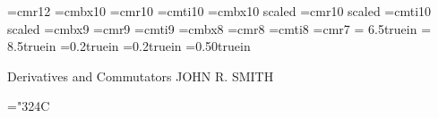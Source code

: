 \font\twelverm=cmr12
\font\tenbf=cmbx10
\font\tenrm=cmr10
\font\tenit=cmti10
\font\elevenbf=cmbx10 scaled
\font\elevenrm=cmr10 scaled
\font\elevenit=cmti10 scaled
\font\ninebf=cmbx9
\font\ninerm=cmr9
\font\nineit=cmti9
\font\eightbf=cmbx8
\font\eightrm=cmr8
\font\eightit=cmti8
\font\sevenrm=cmr7
%
%
\textwidth = 6.5truein
\textheight = 8.5truein
\oddsidemargin=0.2truein
\evensidemargin=0.2truein
\topmargin=0.50truein

\null
\begin{center}{{\tenbf Derivatives and Commutators}}
		\vglue 1.0cm
 	       {\tenrm JOHN R.\,\,SMITH\\}
\end{center}
%
\newcommand{\unit}[1]{\mbox{\it #1}}
\newcommand{\subs}[1]{\mbox{\scriptsize\it #1}}
\def\Q2{$Q^2$}
\def\sgp{$\sigma_{\gamma p}\:$}
\mathchardef\Lcur="324C
\def\crfive{\cr\noalign{\vskip 5pt}}
\def\crten{\cr\noalign{\vskip 10pt}}
\def\cofac{\hbox{cofactor}}
\def\gij{g_{ij}}
\def\gijinv{g^{ij}}
\def\half{1\over2}
\def\gab{g_{\alpha\beta}}
\def\gabinv{g^{\alpha\beta}}
\def\gmunu{g_{\mu\nu}}
\def\gmunuinv{g^{\mu\nu}}
\def\gmu{\gamma^\mu}
\def\gmudag{\gamma^{\mu\dag}}
\def\gnu{\gamma^\nu}
\def\gmuc{\gamma_\mu}
\def\gnuc{\gamma_\nu}
\def\gzero{\gamma^0}
\def\gone{\gamma^1}
\def\gtwo{\gamma^2}
\def\gthree{\gamma^3}
\def\gfive{\gamma_5}
\def\gfive{\gamma_5}
\def\gzeroc{\gamma_0}
\def\gonec{\gamma_1}
\def\gtwoc{\gamma_2}
\def\gthreec{\gamma_3}
\def\qsq{{Q^2\over4E_1^2}}
\def\qr2{{Q^2\over2}}
\def\q2{{Q^2}}
\def\hy{\hat{y}}
\def\be{\begin{equation}}
\def\ee{\end{equation}}
\newcommand{\bra}[1]{\langle #1|}
\newcommand{\ket}[1]{|#1\rangle}
\newcommand{\braket}[2]{\langle #1|#2\rangle}

